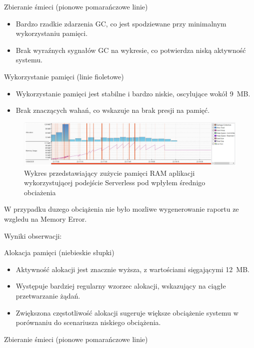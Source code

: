 \documentclass[runningheads,12pt]{llncs}
\begin{document}
Zbieranie śmieci (pionowe pomarańczowe linie)

\begin{itemize}
    \item Bardzo rzadkie zdarzenia GC, co jest spodziewane przy minimalnym wykorzystaniu pamięci.
    \item Brak wyraźnych sygnałów GC na wykresie, co potwierdza niską aktywność systemu.
\end{itemize}

Wykorzystanie pamięci (linie fioletowe)

\begin{itemize}
    \item Wykorzystanie pamięci jest stabilne i bardzo niskie, oscylujące wokół 9~MB.
    \item Brak znaczących wahań, co wskazuje na brak presji na pamięć.
\end{itemize}

\newpage

\begin{figure}
    \includegraphics[width=\linewidth]{images/serverless-memory-middle-graph.jpg}
    \caption{Wykres przedstawiający zużycie pamięci RAM aplikacji wykorzystującej podejście Serverless pod wpłyłem średnigo obciażenia} \label{fig1}
\end{figure}

W przypadku duzego obciążenia nie było mozliwe wygenerowanie raportu ze wzgledu na Memory Error.

Wyniki obserwacji:

Alokacja pamięci (niebieskie słupki)

\begin{itemize}
    \item Aktywność alokacji jest znacznie wyższa, z wartościami sięgającymi 12~MB.
    \item Występuje bardziej regularny wzorzec alokacji, wskazujący na ciągłe przetwarzanie żądań.
    \item Zwiększona częstotliwość alokacji sugeruje większe obciążenie systemu w porównaniu do scenariusza niskiego obciążenia.
\end{itemize}

Zbieranie śmieci (pionowe pomarańczowe linie)
\end{document}
